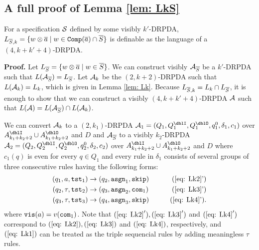 \subsection{A full proof of Lemma \ref{lem: LkS}}
\setcounter{lemma}{\ref{lem: LkS}}
\addtocounter{lemma}{-1}
\begin{lemma}
For a specification ${\cal S}$ defined by some visibly $k'$-DRPDA,
$L_{{\overline{S}}, k} = \{w\otimes{\overline{a}} \mid w\in{\mathtt{Comp}}({\overline{a}})\cap {\overline{S}}\}$
is definable as the language of a $(4,k+k'+4)$-DRPDA.
\end{lemma}
{\bf Proof.}\quad
Let $L_{{\overline{S}}} = \{w\otimes{\overline{a}}\mid w\in{\overline{S}}\}$.
We can construct visibly ${\cal A}_{{\overline{S}}}$ be a $k'$-DRPDA such that $L({\cal A}_{{\overline{S}}})= L_{{\overline{S}}}$.
Let ${\cal A}_k$ be the $(2,k+2)$-DRPDA
such that $L({\cal A}_k)=L_k$, which is given in Lemma \ref{lem: Lk}.
Because $L_{{\overline{S}}, k} = L_k \cap L_{{\overline{S}}}$, it is enough to show that we can construct a visibly $(4,k+k'+4)$-DRPDA ${\cal A}$ such that $L({\cal A})=L({\cal A}_{{\overline{S}}})\cap L({\cal A}_k)$.

We can convert ${\cal A}_k$ to a $(2,k_1)$-DRPDA $\calA_1=(Q_1, Q^\dblI_1, Q^\dblO_1, q^0_1, \delta_1, c_1)$
over $A^\dblI_{k_1+k_2+2}\cup A^\dblO_{k_1+k_2+2}$ and $D$
and ${\cal A}_{{\overline{S}}}$ to a visibly $k_2$-DRPDA $\calA_2=(Q_2, Q^\dblI_2, Q^\dblO_2, q^0_2, \delta_2, c_2)$
over $A^\dblI_{k_1+k_2+2}\cup A^\dblO_{k_1+k_2+2}$ and $D$
where
$c_1(q)$ is even for every $q\in Q_1$ and
every rule in $\delta_1$
consists of several groups of three consecutive rules having the following forms:
\begin{align}
(q_1, a, \tst_1) &\to (q_2,\asgn_1, \skip)& \tag{\ref{eq: Lk2}'}\\
(q_2, \tau, \tst_2) &\to (q_3,\asgn_2, \com_1)& \tag{\ref{eq: Lk3}'}\\
(q_3, \tau, \tst_3) &\to (q_4,\asgn_3, \skip)& \tag{\ref{eq: Lk4}'}.
\end{align}
where $\mathtt{vis}(a)=v(\mathtt{com}_1)$.
Note that $(\ref{eq: Lk2}'), (\ref{eq: Lk3}')$ and $(\ref{eq: Lk4}')$ correspond to $(\ref{eq: Lk2}), (\ref{eq: Lk3})$ and $(\ref{eq: Lk4})$, respectively, and $(\ref{eq: Lk1})$ can be treated as the triple sequencial rules by adding meaningless $\tau$ rules.

